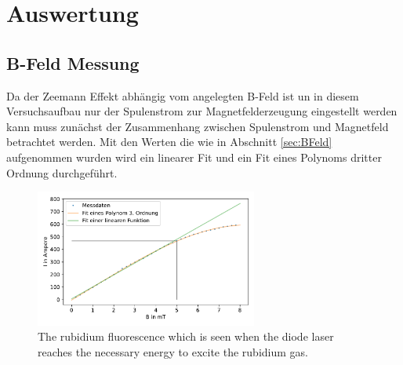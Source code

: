 \newpage
\section{Auswertung}
\label{sec:auswertung}
\subsection{B-Feld Messung}
Da der Zeemann Effekt abhängig vom angelegten B-Feld ist un in diesem Versuchsaufbau nur der Spulenstrom zur Magnetfelderzeugung eingestellt werden kann muss zunächst der Zusammenhang zwischen Spulenstrom und Magnetfeld betrachtet werden.
Mit den Werten die wie in Abschnitt \ref{sec:BFeld} aufgenommen wurden wird ein linearer Fit und ein Fit eines Polynoms dritter Ordnung durchgeführt.
\begin{figure}[ht]
    \center
    \includegraphics[width=0.65\textwidth]{plots/B_Feld.pdf}
    \caption{The rubidium fluorescence which is seen when the diode laser reaches the necessary energy to excite the rubidium gas. \cite{anleitungHeNe}}
    \label{fig:B_Feld}
\end{figure}
